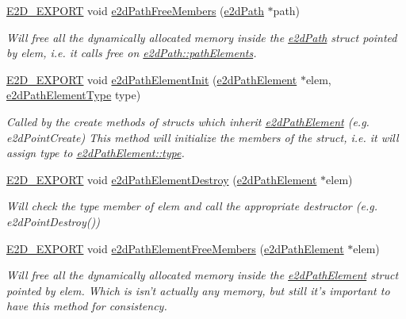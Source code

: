 \begin{DoxyCompactItemize}
\hyperlink{Ez2DS_8h_a9f14e9cb869e1a85fdaba03afcca0df9}{E2\-D\-\_\-\-E\-X\-P\-O\-R\-T} void \hyperlink{group__e2dPath_ga4df45661b4e01f38925a541f91ede422}{e2d\-Path\-Free\-Members} (\hyperlink{structe2dPath}{e2d\-Path} $\ast$path)
\begin{DoxyCompactList}\small\item\em Will free all the dynamically allocated memory inside the \hyperlink{structe2dPath}{e2d\-Path} struct pointed by elem, i.\-e. it calls free on \hyperlink{structe2dPath_ac0c8a45ff4f8d02e557fb33887743439}{e2d\-Path\-::path\-Elements}. \end{DoxyCompactList}\item 
\hyperlink{Ez2DS_8h_a9f14e9cb869e1a85fdaba03afcca0df9}{E2\-D\-\_\-\-E\-X\-P\-O\-R\-T} void \hyperlink{group__e2dPath_gab17d15f04aabeec94a923839aaf5a49e}{e2d\-Path\-Element\-Init} (\hyperlink{structe2dPathElement}{e2d\-Path\-Element} $\ast$elem, \hyperlink{group__e2dPath_gabecf8438085bebe6b28b4a8fb69b1507}{e2d\-Path\-Element\-Type} type)
\begin{DoxyCompactList}\small\item\em Called by the create methods of structs which inherit \hyperlink{structe2dPathElement}{e2d\-Path\-Element} (e.\-g. e2d\-Point\-Create) This method will initialize the members of the struct, i.\-e. it will assign type to \hyperlink{structe2dPathElement_acb2ed01d1856b82777314d8eb8f66b01}{e2d\-Path\-Element\-::type}. \end{DoxyCompactList}\item 
\hyperlink{Ez2DS_8h_a9f14e9cb869e1a85fdaba03afcca0df9}{E2\-D\-\_\-\-E\-X\-P\-O\-R\-T} void \hyperlink{group__e2dPath_ga334ce1c6b0f6c3868ab2d546c0e67c14}{e2d\-Path\-Element\-Destroy} (\hyperlink{structe2dPathElement}{e2d\-Path\-Element} $\ast$elem)
\begin{DoxyCompactList}\small\item\em Will check the type member of elem and call the appropriate destructor (e.\-g. e2d\-Point\-Destroy()) \end{DoxyCompactList}\item 
\hyperlink{Ez2DS_8h_a9f14e9cb869e1a85fdaba03afcca0df9}{E2\-D\-\_\-\-E\-X\-P\-O\-R\-T} void \hyperlink{group__e2dPath_gad2a7aabaa1ebd19138bd24ad5ec0a97e}{e2d\-Path\-Element\-Free\-Members} (\hyperlink{structe2dPathElement}{e2d\-Path\-Element} $\ast$elem)
\begin{DoxyCompactList}\small\item\em Will free all the dynamically allocated memory inside the \hyperlink{structe2dPathElement}{e2d\-Path\-Element} struct pointed by elem. Which is isn't actually any memory, but still it's important to have this method for consistency. \end{DoxyCompactList}\item 

\end{DoxyCompactItemize}
